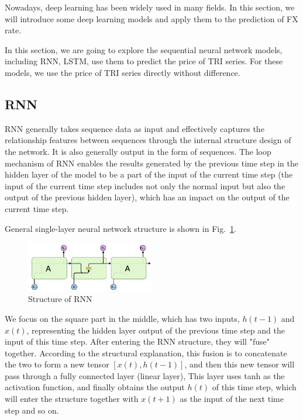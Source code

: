 \documentclass[runningheads]{llncs}
\begin{document}
Nowadays, deep learning has been widely used in many fields. In this section, we will introduce some deep learning models and apply them to the prediction of FX rate.

In this section, we are going to explore the sequential neural network models, including RNN, LSTM, use them to predict the price of TRI series. For these models, we use the price of TRI series directly without difference.

\subsection{RNN}

RNN generally takes sequence data as input and effectively captures the relationship features between sequences through the internal structure design of the network. It is also generally output in the form of sequences.   
The loop mechanism of RNN enables the results generated by the previous time step in the hidden layer of the model to be a part of the input of the current time step (the input of the current time step includes not only the normal input but also the output of the previous hidden layer), which has an impact on the output of the current time step. 

General single-layer neural network structure is shown in Fig.~\ref{fig:14}. 


\begin{figure}[htbp]
    \centering
    \includegraphics[width=0.5\textwidth]{../img/dl/21.png}
    \caption{Structure of RNN}
    \label{fig:14}
\end{figure}

We focus on the square part in the middle, which has two inputs, $h(t-1)$ and $x(t)$, representing the hidden layer output of the previous time step and the input of this time step. After entering the RNN structure, they will "fuse" together. According to the structural explanation, this fusion is to concatenate the two to form a new tensor $[x (t), h (t-1)]$, and then this new tensor will pass through a fully connected layer (linear layer), This layer uses tanh as the activation function, and finally obtains the output $h(t)$ of this time step, which will enter the structure together with $x(t+1)$ as the input of the next time step and so on.
\end{document}
